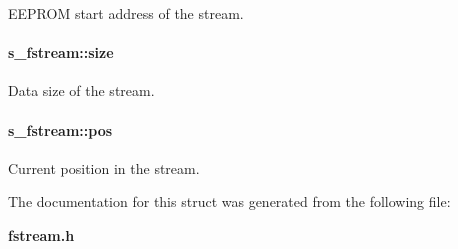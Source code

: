 EEPROM start address of the stream. 

\paragraph{ {\bf s\_\-fstream::size}}\hfill\label{structs__fstream_b803d160e579a1969b9803f19b7a0814}


Data size of the stream. 

\paragraph{ {\bf s\_\-fstream::pos}}\hfill\label{structs__fstream_40b2594138d6556befc29a2c75d254cf}


Current position in the stream. 



The documentation for this struct was generated from the following file:\begin{CompactItemize}
\item 
{\bf fstream.h}\end{CompactItemize}
